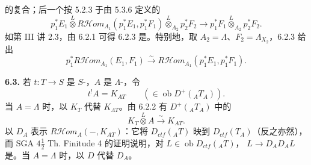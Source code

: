 的复合；后一个按 5.2.3 于由 5.3.6 定义的
\[p_1^*E_1\overset L\otimes R\mathcal H\!om_{A_1}(p_1^*E_1,p_1^*F_1)\overset L\otimes_{A_2}p_2^*F_2\longrightarrow p_1^*F_1\overset L\otimes_{A_2}p_2^*F_2.\]
如第 III 讲 2.3，由 6.2.1 可得
6.2.3 是。特别地，取 $A_2=\Lambda$、$F_2=\Lambda_{X_2}$，6.2.3 给出
\begin{equation}p_1^*R\mathcal H\!om_{A_1}(E_1,F_1)\xrightarrow\sim R\mathcal H\!om_{A_1}(p_1^*E_1,p_1^*F_1).\tag{6.2.4}\end{equation}

\textbf{6.3.} 若 $t:T\to S$ 是 $S$-，$A$ 是 $\Lambda$-，令
\begin{equation}t^!A=K_{AT}\qquad(\in\operatorname{ob}D^+({}_AT_A)).\tag{6.3.1}\end{equation}
当 $A=\Lambda$ 时，以 $K_T$ 代替 $K_{\Lambda T}$。由 6.2.2 有 $D^+({}_AT_A)$ 中的
\begin{equation}K_T\overset L\otimes A\xrightarrow\sim K_{AT}.\tag{6.3.2}\end{equation}
以 $D_A$ 表示 $R\mathcal H\!om_A(-,K_{AT})$：它将 $D_{ctf}({}_AT)$ 映到 $D_{ctf}(T_A)$（反之亦然），而 SGA $4\frac12$ Th. Finitude 4 的证明说明，对 $L\in\operatorname{ob}D_{ctf}({}_AT)$， $L\to D_AD_AL$ 是。当 $A=\Lambda$ 时，以 $D$ 代替 $D_A$。

